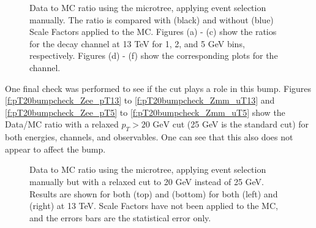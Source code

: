 \begin{figure}[h]
\centering
{}

\caption{Data to MC ratio using the \pTZ microtree, applying \Zboson event selection manually. The ratio is compared with (black) and without (blue) Scale Factors applied to the MC. Figures (a) - (c) show the \ut ratios for the \Zee decay channel at 13 TeV for 1, 2, and 5 GeV bins, respectively. Figures (d) - (f) show the corresponding plots for the \Zmm channel.}\end{figure}

One final check was performed to see if the \pTZ cut plays a role in this bump. Figures \ref{f:pT20bumpcheck_Zee_pT13} to \ref{f:pT20bumpcheck_Zmm_uT13} and \ref{f:pT20bumpcheck_Zee_pT5} to \ref{f:pT20bumpcheck_Zmm_uT5} show the Data/MC ratio with a relaxed $p_{T} > 20 \textrm{ GeV}$ cut (25 GeV is the standard cut) for both energies, channels, and observables. One can see that this also does not appear to affect the bump.

\begin{figure}[h]
\centering
{}

\caption{Data to MC ratio using the \pTZ microtree, applying \Zboson event selection manually but with a relaxed \pT cut to 20 GeV instead of 25 GeV. Results are shown for both \Zee (top) and \Zmm (bottom) for both \ptdilep (left) and \ut (right) at 13 TeV. Scale Factors have not been applied to the MC, and the errors bars are the statistical error only.}\end{figure}


